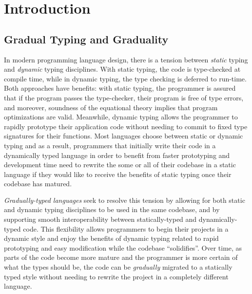 \section{Introduction}
  
\subsection{Gradual Typing and Graduality}
In modern programming language design, there is a tension between \emph{static} typing
and \emph{dynamic} typing disciplines.
With static typing, the code is type-checked at compile time, while in dynamic typing,
the type checking is deferred to run-time. Both approaches have benefits: with static 
typing, the programmer is assured that if the program passes the type-checker, their
program is free of type errors, and moreover, soundness of the equational theory implies
that program optimizations are valid.
Meanwhile, dynamic typing allows the programmer to rapidly prototype
their application code without needing to commit to fixed type signatures for their
functions. Most languages choose between static or dynamic typing and as a result, programmers that initially write their code in a dynamically typed language
in order to benefit from faster prototyping and development time need to rewrite the
some or all of their codebase in a static language if they would like to receive the benefits of static
typing once their codebase has matured.

\emph{Gradually-typed languages} \cite{siek-taha06, tobin-hochstadt06} seek to resolve this tension
by allowing for both static and dynamic typing disciplines to be used in the same codebase,
and by supporting smooth interoperability between statically-typed and dynamically-typed code.
This flexibility allows programmers to begin their projects in a dynamic style and
enjoy the benefits of dynamic typing related to rapid prototyping and easy modification
while the codebase ``solidifies''. Over time, as parts of the code become more mature
and the programmer is more certain of what the types should be, the code can be
\emph{gradually} migrated to a statically typed style without needing to
rewrite the project in a completely different language.


